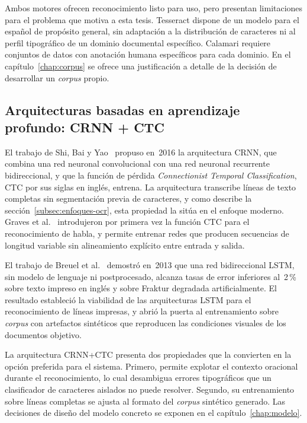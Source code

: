 Ambos motores ofrecen reconocimiento listo para uso, pero presentan limitaciones para el problema que motiva a esta tesis. Tesseract dispone de un modelo para el español de propósito general, sin adaptación a la distribución de caracteres ni al perfil tipográfico de un dominio documental específico. Calamari requiere conjuntos de datos con anotación humana específicos para cada dominio. En el capítulo~\ref{chap:corpus} se ofrece una justificación a detalle de la decisión de desarrollar un \textit{corpus} propio.

\subsection{Arquitecturas basadas en aprendizaje profundo: CRNN + CTC}
\label{subsec:crnn-ctc-arte}

El trabajo de Shi, Bai y Yao~\cite{shi2016crnn} propuso en~2016 la arquitectura CRNN, que combina una red neuronal convolucional con una red neuronal recurrente bidireccional, y que la función de pérdida \textit{Connectionist Temporal Classification}, CTC por sus siglas en inglés, entrena. La arquitectura transcribe líneas de texto completas sin segmentación previa de caracteres, y como describe la sección~\ref{subsec:enfoques-ocr}, esta propiedad la sitúa en el enfoque moderno. Graves et al.~\cite{graves2006ctc} introdujeron por primera vez la función CTC para el reconocimiento de habla, y permite entrenar redes que producen secuencias de longitud variable sin alineamiento explícito entre entrada y salida.

El trabajo de Breuel et al.~\cite{breuel2013ocropus} demostró en~2013 que una red bidireccional LSTM, sin modelo de lenguaje ni postprocesado, alcanza tasas de error inferiores al~2\,\% sobre texto impreso en inglés y sobre Fraktur degradada artificialmente. El resultado estableció la viabilidad de las arquitecturas LSTM para el reconocimiento de líneas impresas, y abrió la puerta al entrenamiento sobre \textit{corpus} con artefactos sintéticos que reproducen las condiciones visuales de los documentos objetivo.

La arquitectura CRNN+CTC presenta dos propiedades que la convierten en la opción preferida para el sistema. Primero, permite explotar el contexto oracional durante el reconocimiento, lo cual desambigua errores tipográficos que un clasificador de caracteres aislados no puede resolver. Segundo, su entrenamiento sobre líneas completas se ajusta al formato del \textit{corpus} sintético generado. Las decisiones de diseño del modelo concreto se exponen en el capítulo~\ref{chap:modelo}.

